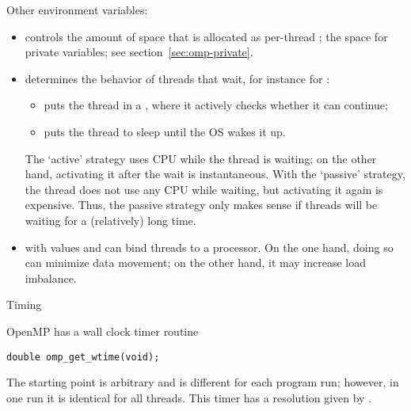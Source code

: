 Other environment variables:
\begin{itemize}
\item {} controls the amount of space that is
  allocated as per-thread ; the space for private
  variables; see section~\ref{sec:omp-private}.
\item {} determines the behavior of
  threads that wait, for instance for :
  \begin{itemize}
  \item {} puts the thread in a , where
    it actively checks whether it can continue;
  \item {} puts the thread to sleep until the \ac{OS} wakes
    it up.
  \end{itemize}
  The `active' strategy uses CPU while the thread is waiting; on the
  other hand, activating it after the wait is instantaneous. With the
  `passive' strategy, the thread does not use any CPU while waiting,
  but activating it again is expensive. Thus, the passive strategy
  only makes sense if threads will be waiting for a (relatively) long
  time.
\item {} with values  and 
  can bind threads to a processor. On the one hand, doing so can
  minimize data movement; on the other hand, it may increase load
  imbalance.
\end{itemize}


 {Timing}
\label{sec:omp-timing}

OpenMP has a wall clock timer routine 
\begin{lstlisting}
double omp_get_wtime(void);
\end{lstlisting}
The starting point is arbitrary and is different for each program run;
however, in one run it is identical for all threads.
This timer has a resolution given by .

